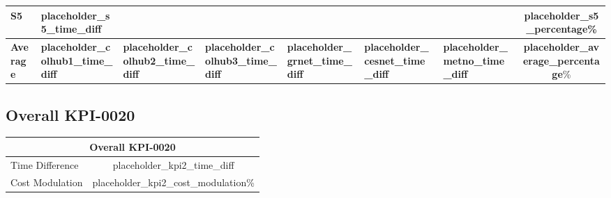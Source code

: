 \documentclass{article}
\begin{document}
\begin{table}[H]
{\begin{tabular}{|l|l|l|l|l|l|l|c|}
S5                           & placeholder_s5_time_diff     &                  &                  &                &                 &                 & placeholder_s5_percentage\% \\ \hline
\textbf{Average} & \textbf{placeholder_colhub1_time_diff}
                 & \textbf{placeholder_colhub2_time_diff}
                 & \textbf{placeholder_colhub3_time_diff}
                 & \textbf{placeholder_grnet_time_diff}
                 & \textbf{placeholder_cesnet_time_diff}
                 & \textbf{placeholder_metno_time_diff}
                 & \textbf{placeholder_average_percentage}\% \\ \hline
\end{tabular}%
}
\end{table}

\subsection{Overall KPI-0020}

\begin{table}[H]
\centering
\begin{tabular}{|l|c|}
\hline
\multicolumn{2}{|c|}{\textbf{Overall KPI-0020}} \\ \hline
Time Difference & placeholder_kpi2_time_diff \\ \hline
Cost Modulation & placeholder_kpi2_cost_modulation\% \\ \hline
\end{tabular}
\end{table}
\end{document}
